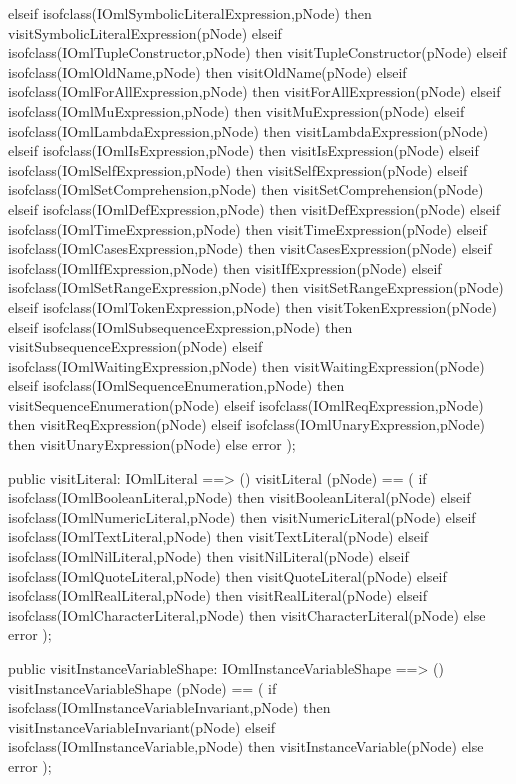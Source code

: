 \begin{vdm_al}
      elseif isofclass(IOmlSymbolicLiteralExpression,pNode) then visitSymbolicLiteralExpression(pNode)
      elseif isofclass(IOmlTupleConstructor,pNode) then visitTupleConstructor(pNode)
      elseif isofclass(IOmlOldName,pNode) then visitOldName(pNode)
      elseif isofclass(IOmlForAllExpression,pNode) then visitForAllExpression(pNode)
      elseif isofclass(IOmlMuExpression,pNode) then visitMuExpression(pNode)
      elseif isofclass(IOmlLambdaExpression,pNode) then visitLambdaExpression(pNode)
      elseif isofclass(IOmlIsExpression,pNode) then visitIsExpression(pNode)
      elseif isofclass(IOmlSelfExpression,pNode) then visitSelfExpression(pNode)
      elseif isofclass(IOmlSetComprehension,pNode) then visitSetComprehension(pNode)
      elseif isofclass(IOmlDefExpression,pNode) then visitDefExpression(pNode)
      elseif isofclass(IOmlTimeExpression,pNode) then visitTimeExpression(pNode)
      elseif isofclass(IOmlCasesExpression,pNode) then visitCasesExpression(pNode)
      elseif isofclass(IOmlIfExpression,pNode) then visitIfExpression(pNode)
      elseif isofclass(IOmlSetRangeExpression,pNode) then visitSetRangeExpression(pNode)
      elseif isofclass(IOmlTokenExpression,pNode) then visitTokenExpression(pNode)
      elseif isofclass(IOmlSubsequenceExpression,pNode) then visitSubsequenceExpression(pNode)
      elseif isofclass(IOmlWaitingExpression,pNode) then visitWaitingExpression(pNode)
      elseif isofclass(IOmlSequenceEnumeration,pNode) then visitSequenceEnumeration(pNode)
      elseif isofclass(IOmlReqExpression,pNode) then visitReqExpression(pNode)
      elseif isofclass(IOmlUnaryExpression,pNode) then visitUnaryExpression(pNode)
      else error );

  public visitLiteral: IOmlLiteral ==> ()
  visitLiteral (pNode) ==
    ( if isofclass(IOmlBooleanLiteral,pNode) then visitBooleanLiteral(pNode)
      elseif isofclass(IOmlNumericLiteral,pNode) then visitNumericLiteral(pNode)
      elseif isofclass(IOmlTextLiteral,pNode) then visitTextLiteral(pNode)
      elseif isofclass(IOmlNilLiteral,pNode) then visitNilLiteral(pNode)
      elseif isofclass(IOmlQuoteLiteral,pNode) then visitQuoteLiteral(pNode)
      elseif isofclass(IOmlRealLiteral,pNode) then visitRealLiteral(pNode)
      elseif isofclass(IOmlCharacterLiteral,pNode) then visitCharacterLiteral(pNode)
      else error );

  public visitInstanceVariableShape: IOmlInstanceVariableShape ==> ()
  visitInstanceVariableShape (pNode) ==
    ( if isofclass(IOmlInstanceVariableInvariant,pNode) then visitInstanceVariableInvariant(pNode)
      elseif isofclass(IOmlInstanceVariable,pNode) then visitInstanceVariable(pNode)
      else error );


\end{vdm_al}
